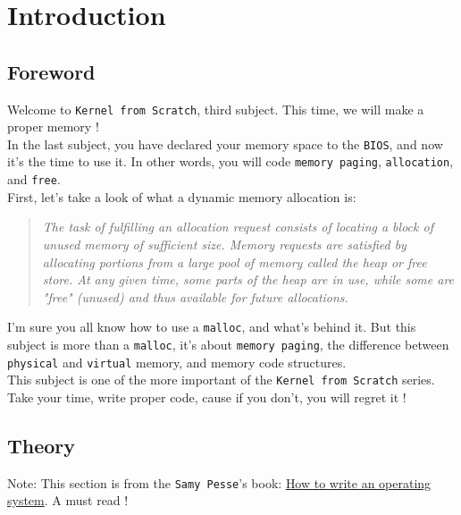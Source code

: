 \documentclass{42-en}
\begin{document}
\chapter{Introduction}

	\section{Foreword}
	Welcome to \texttt{Kernel from Scratch}, third subject. This time, we will
	make a proper memory !\\

	In the last subject, you have declared your memory space to the
	\texttt{BIOS}, and now it's the time to use it. In other words, you will code
	\texttt{memory paging}, \texttt{allocation}, and \texttt{free}.\\

	First, let's take a look of what a dynamic memory allocation is:
	\begin{quotation}
		\textit{The task of fulfilling an allocation request consists of
		locating a block of unused memory of sufficient size. Memory requests
		are satisfied by allocating portions from a large pool of memory called
		the heap or free store. At any given time, some parts of the heap are
		in use, while some are "free" (unused) and thus available for future
		allocations.}
	\end{quotation}

	I'm sure you all know how to use a \texttt{malloc}, and what's behind it.
	But this subject is more than a \texttt{malloc}, it's about
	\texttt{memory paging}, the difference between \texttt{physical} and
	\texttt{virtual} memory, and memory code structures.\\

	This subject is one of the more important of the \texttt{Kernel from Scratch}
	series.	Take your time, write proper code, cause if you don't, you will
	regret it !

\newpage

	\section{Theory}
	Note: This section is from the \texttt{Samy Pesse}'s book:
	\href{https://www.gitbook.com/book/samypesse/how-to-create-an-operating-system/details}
	{How to write an operating system}. A must read !
\end{document}
